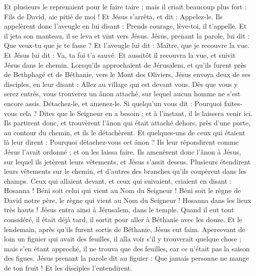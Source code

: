 \begin{multicols}{2}
Et plusieurs le reprenaient pour le faire taire ; mais il criait beaucoup plus fort : Fils de David, aie pitié de moi !
Et Jésus s'arrêta, et dit : Appelez-le. Ils appelèrent donc l'aveugle en lui disant : Prends courage, lève-toi, il t'appelle.
Et il jeta son manteau, il se leva et vint vers Jésus.
Jésus, prenant la parole, lui dit : Que veux-tu que je te fasse ? Et l'aveugle lui dit : Maître, que je recouvre la vue.
Et Jésus lui dit : Va, ta foi t'a sauvé.
Et aussitôt il recouvra la vue, et suivit Jésus dans le chemin.
\VerseOne{}Lorsqu'ils approchaient de Jérusalem, et qu'ils furent près de Bethphagé et de Béthanie, vers le Mont des Oliviers, Jésus envoya deux de ses disciples,
en leur disant : Allez au village qui est devant vous. Dès que vous y serez entrés, vous trouverez un ânon attaché, sur lequel aucun homme ne s'est encore assis. Détachez-le, et amenez-le.
Si quelqu'un vous dit : Pourquoi faites-vous cela ? Dites que le Seigneur en a besoin ; et à l'instant, il le laissera venir ici.
Ils partirent donc, et trouvèrent l'ânon qui était attaché dehors, près d'une porte, au contour du chemin, et ils le détachèrent.
Et quelques-uns de ceux qui étaient là leur dirent : Pourquoi détachez-vous cet ânon ?
Ils leur répondirent comme Jésus l'avait ordonné ; et on les laissa faire.
Ils amenèrent donc l'ânon à Jésus, sur lequel ils jetèrent leurs vêtements, et Jésus s'assit dessus.
Plusieurs étendirent leurs vêtements sur le chemin, et d'autres des branches qu'ils coupèrent dans les champs.
Ceux qui allaient devant, et ceux qui suivaient, criaient en disant : Hosanna ! Béni soit celui qui vient au Nom du Seigneur !
Béni soit le règne de David notre père, le règne qui vient au Nom du Seigneur ! Hosanna dans les lieux très hauts !
Jésus entra ainsi à Jérusalem, dans le temple. Quand il eut tout considéré, il était déjà tard, il sortit pour aller à Béthanie avec les douze.
Et le lendemain, après qu'ils furent sortis de Béthanie, Jésus eut faim.
Apercevant de loin un figuier qui avait des feuilles, il alla voir s'il y trouverait quelque chose ; mais s'en étant approché, il ne trouva que des feuilles, car ce n'était pas la saison des figues.
Jésus prenant la parole dit au figuier : Que jamais personne ne mange de ton fruit ! Et les disciples l'entendirent.

\end{multicols}
